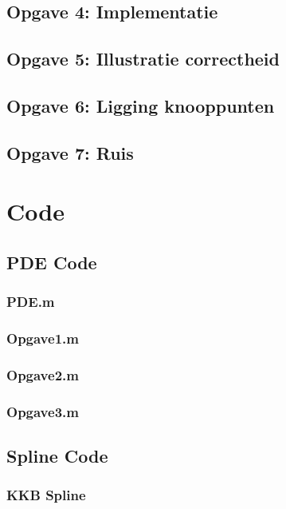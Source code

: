 \documentclass[a4paper]{article}
\newcommand{\opgave}[1]{\subsection{Opgave #1}}
\begin{document}
\opgave{4: Implementatie}\label{sec:oef4}

\opgave{5: Illustratie correctheid}\label{sec:oef5}

\opgave{6: Ligging knooppunten}\label{sec:oef6}

\opgave{7: Ruis}\label{sec:oef7}

\newpage
\section{Code}\label{sec:code}

\subsection{PDE Code}\label{sec:generalpde}

\subsubsection{PDE.m}\label{sec:pde}


\subsubsection{Opgave1.m}\label{sec:code1}


\subsubsection{Opgave2.m}\label{sec:code2}


\subsubsection{Opgave3.m}\label{sec:code3}


\newpage
\subsection{Spline Code}\label{sec:generalspline}

\subsubsection{KKB Spline}\label{sec:codekkb}

\end{document}
